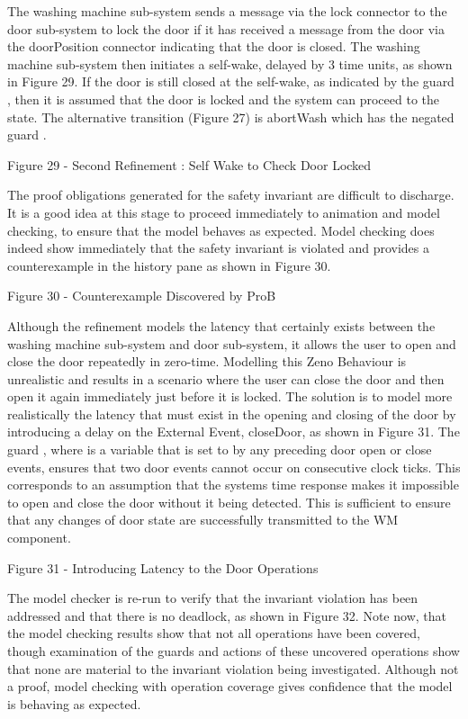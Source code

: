 The washing machine sub-system sends a message via the lock connector to the door sub-system to lock the door if it has received a message from the door via the doorPosition connector indicating that the door is closed.  The washing machine sub-system then initiates a self-wake, delayed by 3 time units, as shown in Figure 29. If the door is still closed at the self-wake, as indicated by the guard 
 ,  then it is assumed that the door is locked and the system can proceed to the   state. The alternative transition (Figure 27) is abortWash which has the negated guard  .
 
Figure 29 - Second Refinement : Self Wake to Check Door Locked

The proof obligations generated for the safety invariant are difficult to discharge. It is a good idea at this stage to proceed immediately to animation and model checking, to ensure that the model behaves as expected.
Model checking does indeed show immediately that the safety invariant is violated and provides a counterexample in the history pane as shown in Figure 30.
 
Figure 30 - Counterexample Discovered by ProB

Although the refinement models the latency that certainly exists between the washing machine sub-system and door sub-system, it allows the user to open and close the door repeatedly in zero-time. Modelling this Zeno Behaviour is unrealistic and results in a scenario where the user can close the door and then open it again immediately just before it is locked.
The solution is to model more realistically the latency that must exist in the opening and closing of the door by introducing a delay on the External Event, closeDoor, as shown in Figure 31. The guard  \textbf{}, where  is a variable that is set to  by any preceding door open or close events, ensures that two door events cannot occur on consecutive clock ticks. This corresponds to an assumption that the systems time response makes it impossible to open and close the door without it being detected. This is sufficient to ensure that any changes of door state are successfully transmitted to the WM component.
 
Figure 31 - Introducing Latency to the Door Operations
 
The model checker is re-run to verify that the invariant violation has been addressed and that there is no deadlock, as shown in Figure 32. Note now, that the model checking results show that not all operations have been covered, though examination of the guards and actions of these uncovered operations show that none are material to the invariant violation being investigated. Although not a proof, model checking with operation coverage gives confidence that the model is behaving as expected.
 
